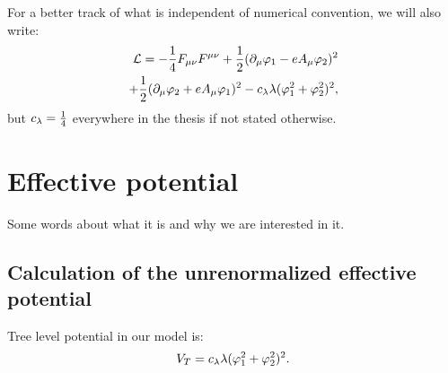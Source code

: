 For a better track of what is independent of numerical convention, we will also write:
\begin{align}\label{scalar_electrodynamics}
\mathcal{L} = -\frac{1}{4}F_{\mu\nu}F^{\mu\nu}+ 
\frac{1}{2}(\partial_\mu\varphi_1 - eA_\mu\varphi_2)^2\\
+\frac{1}{2}(\partial_\mu\varphi_2+eA_\mu\varphi_1)^2
-c_\lambda\lambda(\varphi_1^2+\varphi_2^2)^2, \notag
\end{align}
but $c_\lambda = \frac{1}{4}$ everywhere in the thesis if not stated otherwise.
\section{Effective potential}
\todo{}
Some words about what it is and why we are interested in it.


\subsection{Calculation of the unrenormalized effective potential}

Tree level potential in our model is:
\begin{equation}
V_T = c_\lambda\lambda(\varphi_1^2+\varphi_2^2)^2.
\end{equation}


